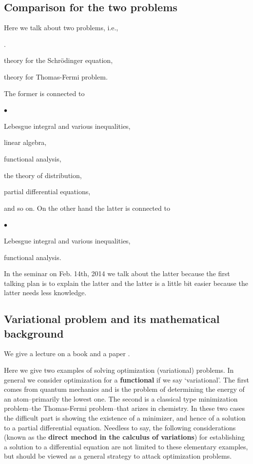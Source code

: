 \documentclass[openany, a4paper, oneside]{book}
\newcounter{enum2}
\renewenvironment{enumerate}{%
\begin{list}%
{%
\arabic{enum2}.\ \,%
}%
{%
\usecounter{enum2}
\setlength{\itemindent}{0pt}%
\setlength{\leftmargin}{6pt}%
\setlength{\rightmargin}{0pt}%
\setlength{\labelsep}{0pt}%
\setlength{\labelwidth}{6pt}%
\setlength{\itemsep}{0pt}%
\setlength{\parsep}{0pt}%
\setlength{\listparindent}{0pt}%
}
}{%
\end{list}%
}
\renewenvironment{itemize}{%
\begin{list}{$\bullet$\ \ }%
{%
\usecounter{enum2}
\setlength{\itemindent}{0pt}%
\setlength{\leftmargin}{6pt}%
\setlength{\rightmargin}{0pt}%
\setlength{\labelsep}{0pt}%
\setlength{\labelwidth}{6pt}%
\setlength{\itemsep}{0pt}%
\setlength{\parsep}{0pt}%
\setlength{\listparindent}{0pt}%
}
}{%
\end{list}%
}
\theoremstyle{break}
\theoremstyle{breakdefn}
\begin{document}
\subsection{Comparison for the two problems}
\label{sec-7-10-1-1}

Here we talk about two problems, i.e.,
\begin{enumerate}
\item theory for the Schr\"odinger equation,
\item theory for Thomas-Fermi problem.
\end{enumerate}
The former is connected to
\begin{itemize}
\item Lebesgue integral and various inequalities,
\item linear algebra,
\item functional analysis,
\item the theory of distribution,
\item partial differential equations,
\end{itemize}
and so on.
On the other hand the latter is connected to
\begin{itemize}
\item Lebesgue integral and various inequalities,
\item functional analysis.
\end{itemize}
In the seminar on Feb. 14th, 2014  we talk about the latter because
the first talking plan is to explain the latter and the latter is a little bit easier
because the latter needs less knowledge.
\subsection{Variational problem and its mathematical background}
\label{sec-7-10-1-2}

We give a lecture on a book \cite{LiebLoss1} and a paper \cite{LiebSimon1}.

Here we give two examples of solving optimization (variational) problems.
In general we consider optimization for a \textbf{functional} if we say `variational'.
The first comes from quantum mechanics and is the problem of determining the energy of an atom--primarily the lowest one.
The second is a classical type minimization problem--the Thomas-Fermi problem--that arizes in chemistry.
In these two cases the difficult part is showing the existence of a minimizer, and hence of a solution
to a partial differential equation.
Needless to say, the following considerations (known as the \textbf{direct mechod in the calculus of variations})
for establishing a solution to a differential equation are not limited to these elementary examples,
but should be viewed as a general strategy to attack optimization problems.
\end{document}
